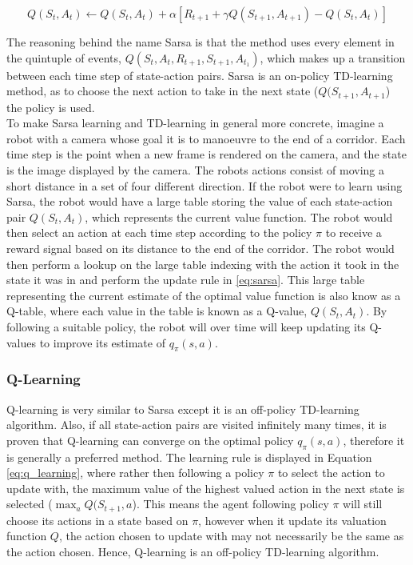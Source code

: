 \documentclass[ %
                    author={Callum Pearce},
                supervisor={Dr. Neill Campbell},
                    degree={MEng},
                     title={How effective are Temporal difference learning methods for reducing the number of zero contribution light paths while still accurately approximating Global Illumination in Path tracing?},
                  subtitle={},
                      type={research},
                      year={2019} ]{dissertation}
\begin{document}
\begin{equation}
Q(S_t, A_t) \leftarrow Q(S_t, A_t) + \alpha[R_{t+1} + \gamma Q(S_{t+1}, A_{t+1}) - Q(S_t, A_t)]
\label{eq:sarsa}
\end{equation}

The reasoning behind the name Sarsa is that the method uses every element in the quintuple of events, $Q(S_t, A_t, R_{t+1}, S_{t+1}, A_{t_1})$, which makes up a transition between each time step of state-action pairs. Sarsa is an on-policy TD-learning method, as to choose the next action to take in the next state ($Q(S_{t+1}, A_{t+1}$) the policy is used. \\

To make Sarsa learning and TD-learning in general more concrete, imagine a robot with a camera whose goal it is to manoeuvre to the end of a corridor. Each time step is the point when a new frame is rendered on the camera, and the state is the image displayed by the camera. The robots actions consist of moving a short distance in a set of four different direction. If the robot were to learn using Sarsa, the robot would have a large table storing the value of each state-action pair $Q(S_t, A_t)$, which represents the current value function. The robot would then select an action at each time step according to the policy $\pi$ to receive a reward signal based on its distance to the end of the corridor. The robot would then perform a lookup on the large table indexing with the action it took in the state it was in and perform the update rule in \ref{eq:sarsa}. This large table representing the current estimate of the optimal value function is also know as a Q-table, where each value in the table is known as a Q-value, $Q(S_t, A_t)$. By following a suitable policy, the robot will over time will keep updating its Q-values to improve
its estimate of $q_\pi(s,a)$.

\subsubsection{Q-Learning}

Q-learning is very similar to Sarsa except it is an off-policy TD-learning algorithm. Also, if all state-action pairs are visited infinitely many times, it is proven that Q-learning can converge on the optimal policy $q_\pi(s,a)$, therefore it is generally a preferred method. The learning rule is displayed in Equation \ref{eq:q_learning}, where rather then following a policy $\pi$ to select the action to update with, the maximum value of the highest valued action in the next state is selected ($\max_a Q(S_{t+1}, a$). This means the agent following policy $\pi$ will still choose its actions in a state based on $\pi$, however when it update its valuation function $Q$, the action chosen to update with may not necessarily be the same as the action chosen. Hence, Q-learning is an off-policy TD-learning algorithm.
\end{document}
